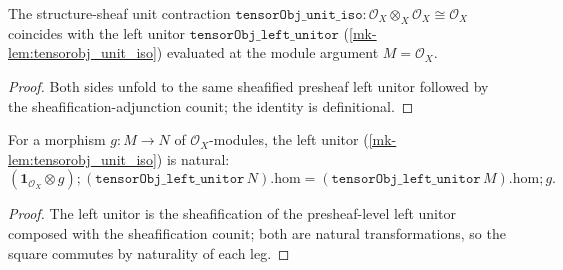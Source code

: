 \begin{lemma}\label{mk-lem:tensorobj_unit_iso_eq_left_unitor}
  \leanok

  The structure-sheaf unit contraction
  \(\mathtt{tensorObj\_unit\_iso} : \mathcal{O}_X \otimes_X \mathcal{O}_X \cong \mathcal{O}_X\)
  coincides with the left unitor \(\mathtt{tensorObj\_left\_unitor}\) (\ref{mk-lem:tensorobj_unit_iso})
  evaluated at the module argument \(M = \mathcal{O}_X\).
\end{lemma}
\begin{proof}
  \leanok
  Both sides unfold to the same sheafified presheaf left unitor followed by the
  sheafification-adjunction counit; the identity is definitional.
\end{proof}

\begin{lemma}\label{mk-lem:tensorobj_left_unitor_naturality}
  \leanok

  For a morphism \(g : M \to N\) of \(\mathcal{O}_X\)-modules, the left unitor
  (\ref{mk-lem:tensorobj_unit_iso}) is natural:
  \[
    (\mathbf 1_{\mathcal{O}_X} \otimes g) \mathbin{;} (\mathtt{tensorObj\_left\_unitor}\,N).\mathrm{hom}
      = (\mathtt{tensorObj\_left\_unitor}\,M).\mathrm{hom} \mathbin{;} g .
  \]
\end{lemma}
\begin{proof}
  \leanok
  The left unitor is the sheafification of the presheaf-level left unitor composed with the
  sheafification counit; both are natural transformations, so the square commutes by naturality of
  each leg.
\end{proof}

